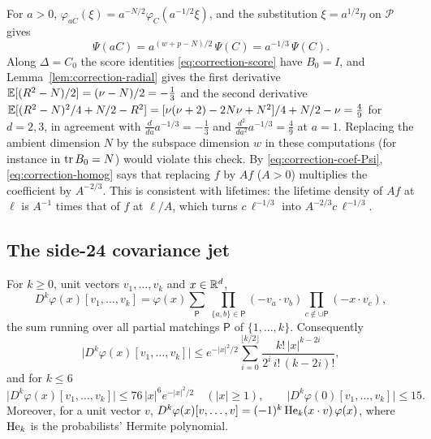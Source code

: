 \begin{remark}\label{rem:correction-homogeneity}
For $a>0$, $\varphi_{aC}(\xi)=a^{-N/2}\varphi_C(a^{-1/2}\xi)$, and the substitution $\xi=a^{1/2}\eta$ on $\mathcal P$ gives
\begin{equation}\label{eq:correction-homog}
\Psi(aC)=a^{(w+p-N)/2}\,\Psi(C)=a^{-1/3}\,\Psi(C).
\end{equation}
Along $\Delta=C_0$ the score identities \eqref{eq:correction-score} have $B_0=I$, and Lemma~\ref{lem:correction-radial} gives the first derivative $\mathbb E[(R^2-N)/2]=(\nu-N)/2=-\frac13$ and the second derivative $\mathbb E[(R^2-N)^2/4+N/2-R^2]=[\nu(\nu+2)-2N\nu+N^2]/4+N/2-\nu=\frac49$ for $d=2,3$, in agreement with $\frac{d}{da}a^{-1/3}=-\frac13$ and $\frac{d^2}{da^2}a^{-1/3}=\frac49$ at $a=1$. Replacing the ambient dimension $N$ by the subspace dimension $w$ in these computations (for instance in $\operatorname{tr} B_0=N$) would violate this check. By \eqref{eq:correction-coef-Psi}, \eqref{eq:correction-homog} says that replacing $f$ by $Af$ ($A>0$) multiplies the coefficient by $A^{-2/3}$. This is consistent with lifetimes: the lifetime density of $Af$ at $\ell$ is $A^{-1}$ times that of $f$ at $\ell/A$, which turns $c\,\ell^{-1/3}$ into $A^{-2/3}c\,\ell^{-1/3}$.
\end{remark}

\subsection{The side-24 covariance jet}

\begin{lemma}\label{lem:correction-hermite}
For $k\ge0$, unit vectors $v_1,\dots,v_k$ and $x\in\mathbb R^d$,
\begin{equation}\label{eq:correction-wick}
D^k\varphi(x)[v_1,\dots,v_k]=\varphi(x)\sum_{\mathsf P}\ \prod_{\{a,b\}\in\mathsf P}(-v_a\cdot v_b)\prod_{c\notin\cup\mathsf P}(-x\cdot v_c),
\end{equation}
the sum running over all partial matchings $\mathsf P$ of $\{1,\dots,k\}$. Consequently
\[
\bigl|D^k\varphi(x)[v_1,\dots,v_k]\bigr|\le e^{-|x|^2/2}\sum_{i=0}^{\lfloor k/2\rfloor}\frac{k!\,|x|^{k-2i}}{2^i\,i!\,(k-2i)!},
\]
and for $k\le6$
\begin{equation}\label{eq:correction-derivbound}
\bigl|D^k\varphi(x)[v_1,\dots,v_k]\bigr|\le76\,|x|^6e^{-|x|^2/2}\quad(|x|\ge1),\qquad\bigl|D^k\varphi(0)[v_1,\dots,v_k]\bigr|\le15 .
\end{equation}
Moreover, for a unit vector $v$, $D^k\varphi(x)[v,\dots,v]=(-1)^k\operatorname{He}_k(x\cdot v)\,\varphi(x)$, where $\operatorname{He}_k$ is the probabilists' Hermite polynomial.
\end{lemma}

